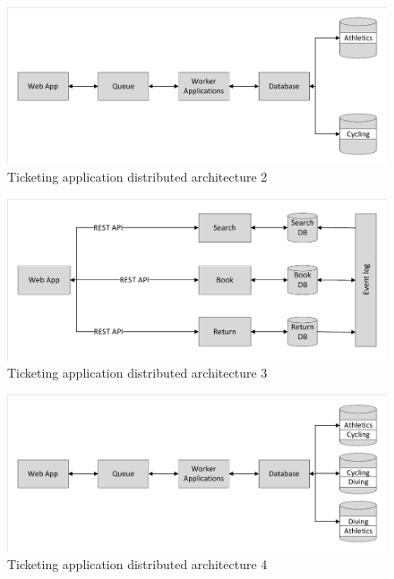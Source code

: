 \documentclass{llncs}
\begin{document}
\begin{figure}
	\caption{Ticketing application distributed architecture 2}
	\centering
	\includegraphics[trim = 5 5 5 5, clip, width=\textwidth]{img/sharedqueue}
\end{figure}

\begin{figure}
	\caption{Ticketing application distributed architecture 3}
	\centering
	\includegraphics[trim = 5 5 5 5, clip, width=\textwidth]{img/operationmicro}
\end{figure}

\begin{figure}
	\caption{Ticketing application distributed architecture 4}
	\centering
	\includegraphics[trim = 5 5 5 5, clip, width=\textwidth]{img/sharedqueue_withrep}
\end{figure}

%
%



%
%



%
%



%
%



\end{document}
